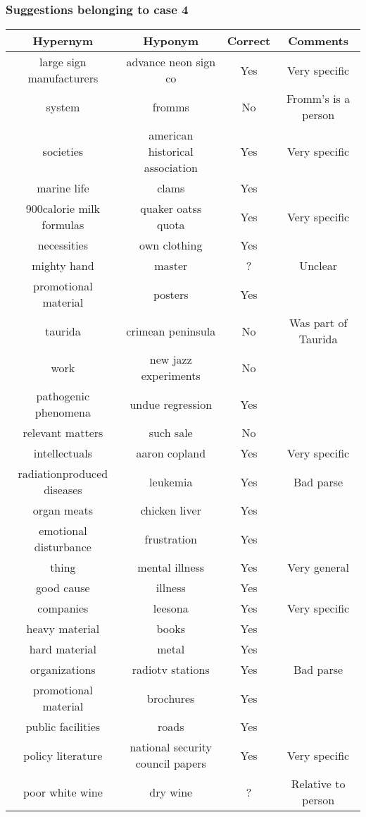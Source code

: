 \documentclass[11pt]{article}
\begin{document}
\subsubsection{Suggestions belonging to case 4}
\begin{tabular}{c c c c}
Hypernym & Hyponym & Correct & Comments \\ \hline
large sign manufacturers & advance neon sign co & Yes & Very specific \\
system & fromms & No & Fromm's is a person\\
societies & american historical association & Yes & Very specific \\
marine life & clams & Yes\\
900calorie milk formulas & quaker oatss quota & Yes & Very specific\\
necessities & own clothing & Yes\\
mighty hand & master & ? & Unclear\\
promotional material & posters & Yes\\
taurida & crimean peninsula & No & Was part of Taurida\\
work & new jazz experiments & No\\
pathogenic phenomena & undue regression & Yes \\
relevant matters & such sale & No\\
intellectuals & aaron copland & Yes & Very specific\\
radiationproduced diseases & leukemia & Yes & Bad parse\\
organ meats & chicken liver & Yes\\
emotional disturbance & frustration & Yes \\
thing & mental illness & Yes & Very general\\
good cause & illness & Yes\\
companies & leesona & Yes & Very specific\\
heavy material & books & Yes\\
hard material & metal & Yes\\
organizations & radiotv stations & Yes & Bad parse\\
promotional material & brochures & Yes\\
public facilities & roads & Yes\\
policy literature & national security council papers & Yes & Very specific\\
poor white wine & dry wine & ? & Relative to person\\

\end{tabular}
\end{document}
